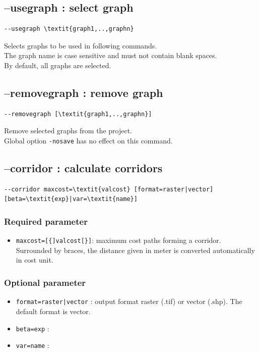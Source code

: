 \documentclass[a4paper,10pt]{report}
\begin{document}
\subsection{--usegraph : select graph}
\label{usegraph}
\begin{Verbatim}[commandchars=\\\{\}]
--usegraph \textit{graph1,..,graphn}
\end{Verbatim}
Selects graphs to be used in following commands.\\
The graph name is case sensitive and must not contain blank spaces.\\
By default, all graphs are selected.

\subsection{--removegraph : remove graph}
\begin{Verbatim}[commandchars=\\\{\}]
--removegraph [\textit{graph1,..,graphn}]
\end{Verbatim}
Remove selected graphs from the project.\\
Global option \verb|-nosave| has no effect on this command.


\subsection{--corridor : calculate corridors}
\begin{Verbatim}[commandchars=\\\{\}]
--corridor maxcost=\textit{valcost} [format=raster|vector] [beta=\textit{exp}|var=\textit{name}]
\end{Verbatim}

\subsubsection{Required parameter}
\begin{itemize}
	\item \verb|maxcost=[{]valcost[}]|: maximum cost paths forming a corridor. Surrounded by braces, the distance given in meter is converted automatically in cost unit.
\end{itemize}

\subsubsection{Optional parameter}
\begin{itemize}
	\item \verb+format=raster|vector+ : output format raster (.tif) or vector (.shp). The default format is vector.
	\item \verb|beta=exp| : 
	\item \verb|var=name| : 	
\end{itemize}
\end{document}
